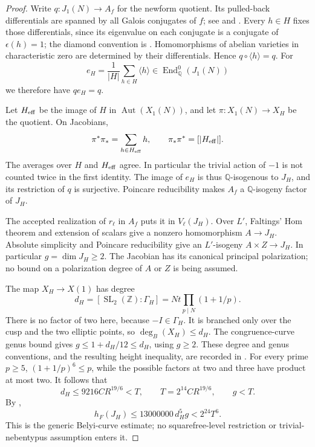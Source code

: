 \documentclass[11pt]{article}
\theoremstyle{definition}
\theoremstyle{remark}
\begin{document}
\begin{proof}
Write $q:J_1(N)\to A_f$ for the newform quotient. Its pulled-back
differentials are spanned by all Galois conjugates of $f$; see
\cite[Theorem~1(i),(iv), p.~526]{shimura-factors} and
\cite[\S3.1]{baker-et-al-finiteness}. Every $h\in H$ fixes those differentials,
since its eigenvalue on each conjugate is a conjugate of $\epsilon(h)=1$;
the diamond convention is \cite[\S3.2.1]{baker-et-al-finiteness}.
Homomorphisms of abelian varieties in characteristic zero are determined
by their differentials. Hence $q\circ\langle h\rangle=q$.
For
\[
 e_H=\frac1{|H|}\sum_{h\in H}\langle h\rangle
       \in\operatorname{End}_{\mathbb Q}^0(J_1(N))
\]
we therefore have $qe_H=q$.

Let $H_{\rm eff}$ be the image of $H$ in
$\operatorname{Aut}(X_1(N))$, and let $\pi:X_1(N)\to X_H$ be the quotient.
On Jacobians,
\[
 \pi^*\pi_*=\sum_{h\in H_{\rm eff}}h,\qquad
 \pi_*\pi^*=[|H_{\rm eff}|].
\]
The averages over $H$ and $H_{\rm eff}$ agree. In particular the trivial
action of $-1$ is not counted twice in the first identity.
The image of $e_H$ is thus $\mathbb Q$-isogenous to $J_H$, and its
restriction of $q$ is surjective. Poincare reducibility makes $A_f$
a $\mathbb Q$-isogeny factor of $J_H$.

The accepted realization of $r_\ell$ in $A_f$ puts it in $V_\ell(J_H)$.
Over $L'$, Faltings' Hom theorem and extension of scalars give a nonzero
homomorphism $A\to J_H$. Absolute simplicity and Poincare reducibility
give an $L'$-isogeny $A\times Z\to J_H$. In particular
$g=\dim J_H\ge2$. The Jacobian has its canonical principal polarization;
no bound on a polarization degree of $A$ or $Z$ is being assumed.

The map $X_H\to X(1)$ has degree
\[
 d_H=[\operatorname{SL}_2(\mathbb Z):\Gamma_H]
     =Nt\prod_{p\mid N}(1+1/p).
\]
There is no factor of two here, because $-I\in\Gamma_H$.
It is branched only over the cusp and the two elliptic points, so
$\deg_B(X_H)\le d_H$. The congruence-curve genus bound gives
$g\le1+d_H/12\le d_H$, using $g\ge2$.
These degree and genus conventions, and the resulting height inequality,
are recorded in \cite[\S4, (4.1)--(4.2), p.~8]{vonKaenel2021}.
For every prime $p\ge5$, $(1+1/p)^6\le p$, while the possible factors
at two and three have product at most two. It follows that
\[
 d_H\le9216CR^{19/6}<T,\qquad
 T=2^{14}CR^{19/6},\qquad g<T.
\]
By \cite[Theorem~1.1.1 and \S2.3]{javanpeykar},
\[
 h_F(J_H)\le13000000\,d_H^5g<2^{24}T^6.
\]
This is the generic Belyi-curve estimate; no squarefree-level restriction
or trivial-nebentypus assumption enters it.


\end{proof}
\end{document}
